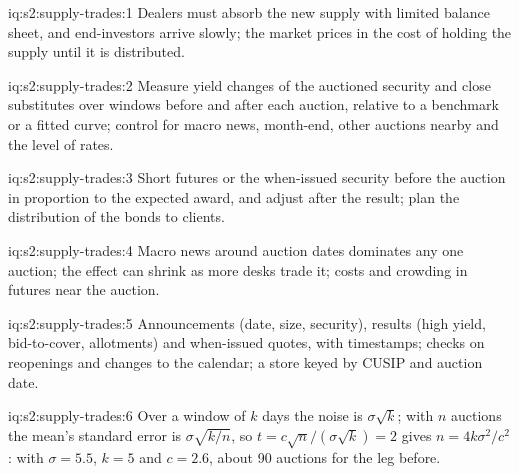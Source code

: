\begin{solution}{iq:s2:supply-trades:1}
Dealers must absorb the new supply with limited balance sheet, and end-investors arrive slowly; the market prices in the cost of holding the supply
until it is distributed.
\end{solution}

\begin{solution}{iq:s2:supply-trades:2}
Measure yield changes of the auctioned security and close substitutes over windows before and after each auction, relative to a benchmark or a
fitted curve; control for macro news, month-end, other auctions nearby and the level of rates.
\end{solution}

\begin{solution}{iq:s2:supply-trades:3}
Short futures or the when-issued security before the auction in proportion to the expected award, and adjust after the result; plan the
distribution of the bonds to clients.
\end{solution}

\begin{solution}{iq:s2:supply-trades:4}
Macro news around auction dates dominates any one auction; the effect can shrink as more desks trade it; costs and crowding in futures near the
auction.
\end{solution}

\begin{solution}{iq:s2:supply-trades:5}
Announcements (date, size, security), results (high yield, bid-to-cover, allotments) and when-issued quotes, with timestamps; checks on reopenings
and changes to the calendar; a store keyed by CUSIP and auction date.
\end{solution}

\begin{solution}{iq:s2:supply-trades:6}
Over a window of $k$ days the noise is $\sigma\sqrt k$; with $n$ auctions the mean's standard error is $\sigma\sqrt{k/n}$, so $t = c\sqrt n/(\sigma\sqrt
k) = 2$ gives $n = 4k\sigma^2/c^2$: with $\sigma = 5.5$, $k = 5$ and $c = 2.6$, about 90 auctions for the leg before.
\end{solution}
